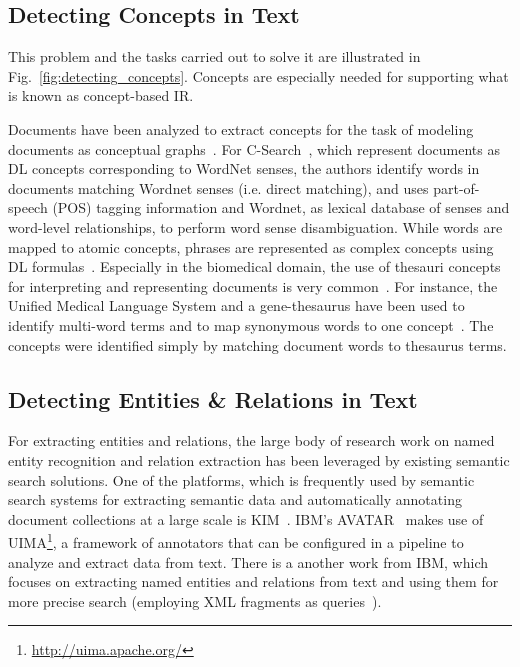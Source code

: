 \subsection{Detecting Concepts in Text} This problem and the tasks carried out to solve it are illustrated in Fig.~\ref{fig:detecting_concepts}. Concepts are especially needed for supporting what is known as concept-based IR. 

Documents have been analyzed to extract concepts for the task of modeling documents as conceptual graphs~\cite{DBLP:conf/iccs/ComparotHH07}. For C-Search~\cite{DBLP:conf/esws/GiunchigliaKZ09}, which represent documents as DL concepts corresponding to WordNet senses, the authors identify words in documents matching Wordnet senses (i.e. direct matching), and uses part-of-speech (POS) tagging information and Wordnet, as lexical database of senses and word-level relationships, to perform word sense disambiguation. While words are mapped to atomic concepts, phrases are represented as complex concepts using DL formulas~\cite{DBLP:conf/esws/GiunchigliaKZ09}. Especially in the biomedical domain, the use of thesauri concepts for interpreting and representing documents is very common~\cite{DBLP:conf/trec/TrieschniggKS06,DBLP:conf/trec/ZhouYTS06}. For instance, the Unified Medical Language System and a gene-thesaurus have been used to identify multi-word terms and to map synonymous words to one concept~\cite{DBLP:conf/trec/TrieschniggKS06}. The concepts were identified simply by matching document words to thesaurus terms.
	
	
\subsection{Detecting Entities \& Relations in Text} For extracting entities and relations, the large body of research work on named entity recognition and relation extraction has been leveraged by existing semantic search solutions. One of the platforms, which is frequently used by semantic search systems for extracting semantic data and
automatically annotating document collections at a large scale is KIM~\cite{KIM DBLP:journals/ws/KiryakovPTMO04}. IBM's AVATAR~\cite{DBLP:conf/sigmod/KandoganKRVZ06} makes use of UIMA\footnote{\url{http://uima.apache.org/}}, a framework of annotators that can be configured in a pipeline to analyze and extract data from text. There is a another work from IBM, which focuses on extracting named entities and relations from text and using them for more precise search (employing XML fragments as queries~\cite{DBLP:conf/sigir/Chu-CarrollPCFD06,DBLP:conf/cikm/Chu-CarrollP07}).

